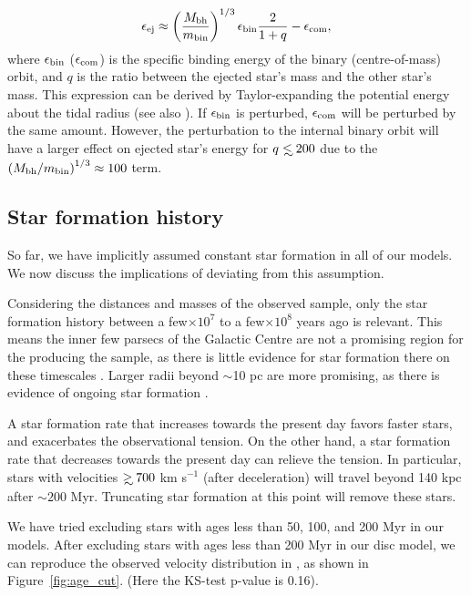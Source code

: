\documentclass[fleqn,usenatbib]{mnras}
\newcommand\lsim{\mathrel{\rlap{\lower4pt\hbox{\hskip1pt$\sim$}}
    \raise1pt\hbox{$<$}}}
\newcommand\gsim{\mathrel{\rlap{\lower4pt\hbox{\hskip1pt$\sim$}}
    \raise1pt\hbox{$>$}}}
\begin{document}
\begin{equation}
    \epsilon_{\rm ej} \approx \left(\frac{M_{\rm bh}}{m_{\rm bin}}\right)^{1/3} \epsilon_{\rm bin} \frac{2}{1+q} -\epsilon_{\rm com},
\end{equation}
where $\epsilon_{\rm bin}$ ($\epsilon_{\rm com}$) is the specific binding energy of the binary (centre-of-mass) orbit, and $q$ is the ratio between the ejected star's  mass and the other star's mass. This expression can be derived by Taylor-expanding the potential energy about the tidal radius (see also \citealt{kobayashi+2012}). If $\epsilon_{\rm bin}$ is perturbed, $\epsilon_{\rm com}$ will be perturbed by the same amount. However, the perturbation to the internal binary orbit will have a larger effect on ejected star's energy for $q\lsim 200$ due to the $\left(M_{\rm bh}/m_{\rm bin}\right)^{1/3}\approx 100$ term.  



\subsection{Star formation history}
\label{sec:sfh}
So far, we have implicitly assumed constant star formation in all of our models. We now discuss the implications of deviating from this assumption. 

Considering the distances and masses of the observed sample, only the star formation history between a few$\times 10^7$ to a few$\times 10^8$ years ago is relevant. This means the inner few parsecs of the Galactic Centre are not a promising region for the producing the \citet{warren_brown+2018} sample, as there is little evidence for star formation there on these timescales \citep{pfuhl+2011}. Larger radii beyond $\sim$10 pc are more promising, as there is evidence of ongoing star formation \citep{nogueras-lara+2020}.

A star formation rate that increases towards the present day favors faster stars, and exacerbates the observational tension. On the other hand, a star formation rate that decreases towards the present day can relieve the tension. In particular, stars with velocities $\gsim 700$ km s$^{-1}$ (after deceleration) will travel beyond 140 kpc after $\sim 200$ Myr. Truncating star formation at this point will remove these stars. 

We have tried excluding stars with ages less than 50, 100, and 200 Myr in our models.  After excluding stars with ages less than 200 Myr in our disc model, we can reproduce the observed velocity distribution in \citet{warren_brown+2018}, as shown in Figure~\ref{fig:age_cut}. (Here the KS-test p-value is 0.16).
\end{document}
